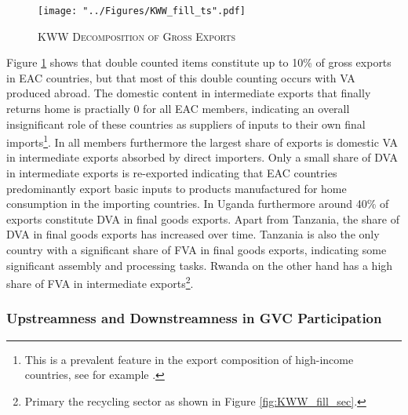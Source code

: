 \documentclass[a4paper]{article}
\begin{document}
\begin{figure}[h!]
\centering
\caption{\label{fig:KWW_fill_ts}\textsc{KWW Decomposition of Gross Exports}}
\texttt{[image: "../Figures/KWW\_fill\_ts".pdf]} %
\end{figure}
\FloatBarrier

Figure \ref{fig:KWW_fill_ts} shows that double counted items constitute up to 10\% of gross exports in EAC countries, but that most of this double counting occurs with VA produced abroad. The domestic content in intermediate exports that finally returns home is practially 0 for all EAC members, indicating an overall insignificant role of these countries as suppliers of inputs to their own final imports\footnote{This is a prevalent feature in the export composition of high-income countries, see for example \citep{Kummritz20162}.}. In all members furthermore the largest share of exports is domestic VA in intermediate exports absorbed by direct importers. Only a small share of DVA in intermediate exports is re-exported indicating that EAC countries predominantly export basic inputs to products manufactured for home consumption in the importing countries. In Uganda furthermore around 40\% of exports constitute DVA in final goods exports. Apart from Tanzania, the share of DVA in final goods exports has increased over time. Tanzania is also the only country with a significant share of FVA in final goods exports, indicating some significant assembly and processing tasks. Rwanda on the other hand has a high share of FVA in intermediate exports\footnote{Primary the recycling sector as shown in Figure \ref{fig:KWW_fill_sec}.}. \newline  %

\subsubsection{Upstreamness and Downstreamness in GVC Participation}

\end{document}
